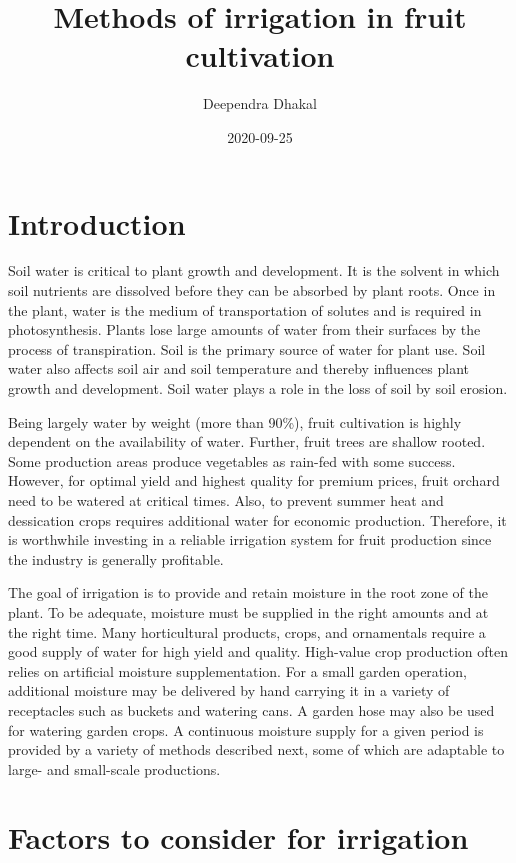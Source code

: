 \documentclass[
]{article}
\title{Methods of irrigation in fruit cultivation}
\author{Deependra Dhakal}
\date{2020-09-25}
\begin{document}
\maketitle

{
\setcounter{tocdepth}{3}
\tableofcontents
}
\hypertarget{introduction}{%
\section{Introduction}\label{introduction}}

Soil water is critical to plant growth and development. It is the solvent in which soil nutrients are dissolved before they can be absorbed by plant roots. Once in the plant, water is the medium of transportation of solutes and is required in photosynthesis. Plants lose large amounts of water from their surfaces by the process of transpiration. Soil is the primary source of water for plant use. Soil water also affects soil air and soil temperature and thereby influences plant growth and development. Soil water plays a role in the loss of soil by soil erosion.

Being largely water by weight (more than 90\%), fruit cultivation is highly dependent on the availability of water. Further, fruit trees are shallow rooted. Some production areas produce vegetables as rain-fed with some success. However, for optimal yield and highest quality for premium prices, fruit orchard need to be watered at critical times. Also, to prevent summer heat and dessication crops requires additional water for economic production. Therefore, it is worthwhile investing in a reliable irrigation system for fruit production since the industry is generally profitable.

The goal of irrigation is to provide and retain moisture in the root zone of the plant. To be adequate, moisture must be supplied in the right amounts and at the right time. Many horticultural products, crops, and ornamentals require a good supply of water for high yield and quality. High-value crop production often relies on artificial moisture supplementation. For a small garden operation, additional moisture may be delivered by hand carrying it in a variety of receptacles such as buckets and watering cans. A garden hose may also be used for watering garden crops. A continuous moisture supply for a given period is provided by a variety of methods described next, some of which are adaptable to large- and small-scale productions.

\hypertarget{factors-to-consider-for-irrigation}{%
\section{Factors to consider for irrigation}\label{factors-to-consider-for-irrigation}}
\end{document}
